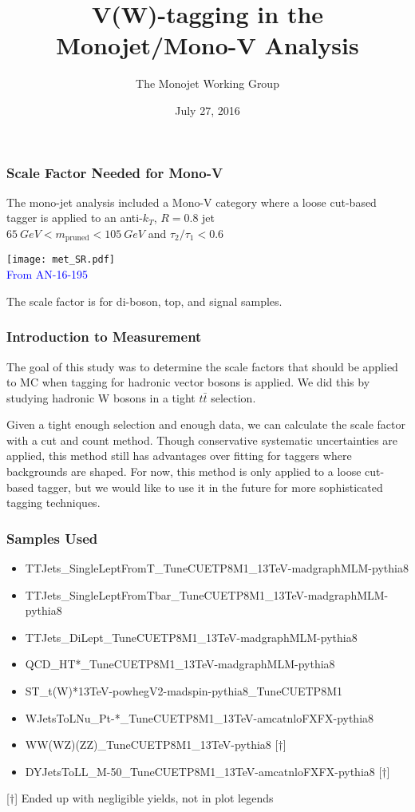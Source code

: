 \documentclass{beamer}
\author[D. Abercrombie]{
  The Monojet Working Group
}
\title{\bf \sffamily V(W)-tagging in the Monojet/Mono-V Analysis}
\date{July 27, 2016}
\begin{document}
\begin{frame}[nonumbering]
  \titlepage
\end{frame}

\begin{frame}
  \frametitle{Scale Factor Needed for Mono-V}
  The mono-jet analysis included a Mono-V category where
  a loose cut-based tagger is applied to an anti-$k_T$, $R = 0.8$ jet \\
  $\SI{65}{GeV} < m_\text{pruned} < \SI{105}{GeV}$ and
  $\tau_2/\tau_1 < 0.6$  

  \begin{center}
    \texttt{[image: met\_SR.pdf]} \\
    \textcolor{blue}{From AN-16-195}
  \end{center}

  The scale factor is for di-boson, top, and signal samples.
\end{frame}

\begin{frame}
  \frametitle{Introduction to Measurement}
  The goal of this study was to determine the scale factors that should
  be applied to MC when tagging for hadronic vector bosons is applied.
  We did this by studying hadronic W bosons in a tight $t\bar{t}$ selection.

  \vspace{12pt}

  Given a tight enough selection and enough data, we can calculate the 
  scale factor with a cut and count method.
  Though conservative systematic uncertainties are applied, this method still has advantages
  over fitting for taggers where backgrounds are shaped.
  For now, this method is only applied to a loose cut-based tagger,
  but we would like to use it in the future for more sophisticated tagging techniques.
\end{frame}

\begin{frame}
  \frametitle{Samples Used}
  {\scriptsize
  \begin{itemize}
  \item TTJets\_SingleLeptFromT\_TuneCUETP8M1\_13TeV-madgraphMLM-pythia8
  \item TTJets\_SingleLeptFromTbar\_TuneCUETP8M1\_13TeV-madgraphMLM-pythia8
  \item TTJets\_DiLept\_TuneCUETP8M1\_13TeV-madgraphMLM-pythia8
  \item QCD\_HT*\_TuneCUETP8M1\_13TeV-madgraphMLM-pythia8
  \item ST\_t(W)*13TeV-powhegV2-madspin-pythia8\_TuneCUETP8M1
  \item WJetsToLNu\_Pt-*\_TuneCUETP8M1\_13TeV-amcatnloFXFX-pythia8
  \item WW(WZ)(ZZ)\_TuneCUETP8M1\_13TeV-pythia8 [$\dagger$]
  \item DYJetsToLL\_M-50\_TuneCUETP8M1\_13TeV-amcatnloFXFX-pythia8 [$\dagger$]
  \end{itemize}
  [$\dagger$] Ended up with negligible yields, not in plot legends
  }
\end{frame}
\end{document}
